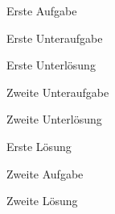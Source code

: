 \documentclass[a4paper]{article}
\begin{document}
\begin{exercise}
    Erste Aufgabe

    \begin{subexercise}
        Erste Unteraufgabe
    \end{subexercise}
    \begin{subsolution}
        Erste Unterlösung
    \end{subsolution}

    \begin{subexercise}
        Zweite Unteraufgabe
    \end{subexercise}
    \begin{subsolution}
        Zweite Unterlösung
    \end{subsolution}

\end{exercise}
\begin{solution}
    Erste Lösung
\end{solution}

\begin{exercise}
    Zweite Aufgabe
\end{exercise}
\begin{solution}
    Zweite Lösung
\end{solution}
\end{document}
